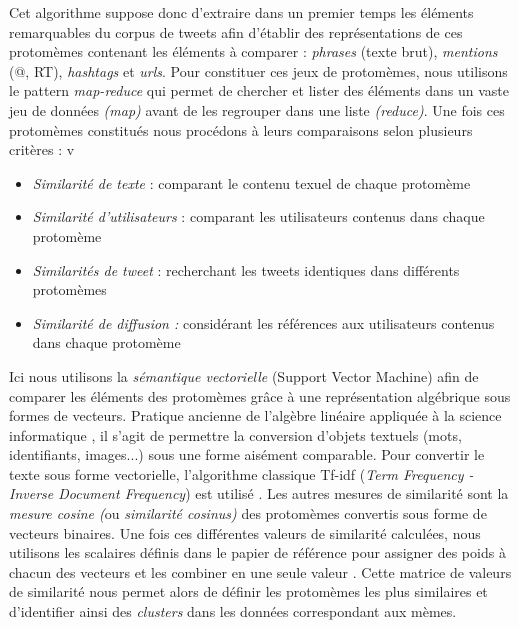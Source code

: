Cet algorithme suppose donc d{\textquoteright}extraire dans un premier
temps les \'el\'ements remarquables du corpus de tweets afin
d{\textquoteright}\'etablir des repr\'esentations de ces protom\`emes
contenant les \'el\'ements \`a comparer : \textit{phrases} (texte
brut), \textit{mentions }(@, RT), \textit{hashtags }et \textit{urls}.
Pour constituer ces jeux de protom\`emes, nous utilisons le pattern
\textit{map-reduce} qui permet de chercher et lister des \'el\'ements
dans un vaste jeu de donn\'ees \textit{(map)} avant de les regrouper
dans une liste \textit{(reduce)}. Une fois ces protom\`emes
constitu\'es nous proc\'edons \`a leurs comparaisons selon plusieurs
crit\`eres :
v
\begin{itemize}
\item \textit{Similarit\'e de texte }: comparant le contenu texuel de
chaque protom\`eme 
\item \textit{Similarit\'e d{\textquoteright}utilisateurs} : comparant
les utilisateurs contenus dans chaque protom\`eme
\item \textit{Similarit\'es de tweet }: recherchant les tweets
identiques dans diff\'erents protom\`emes
\item \textit{Similarit\'e de diffusion : }consid\'erant les
r\'ef\'erences aux utilisateurs contenus dans chaque protom\`eme
\end{itemize}
Ici nous utilisons la \textit{s\'emantique vectorielle} (Support Vector
Machine) afin de comparer les \'el\'ements des protom\`emes gr\^ace \`a
une repr\'esentation alg\'ebrique sous formes de vecteurs. Pratique
ancienne de l{\textquoteright}alg\`ebre lin\'eaire appliqu\'ee \`a la
science informatique \citep{Salton1975}, il s{\textquoteright}agit de
permettre la conversion d{\textquoteright}objets textuels (mots,
identifiants, images...) sous une forme ais\'ement comparable. Pour
convertir le texte sous forme vectorielle, l{\textquoteright}algorithme
classique Tf-idf (\textit{Term Frequency - Inverse Document Frequency})
est utilis\'e \citep{Soucy2005}. Les autres mesures de similarit\'e sont la
\textit{mesure cosine (}ou \textit{similarit\'e cosinus) }des
protom\`emes convertis sous forme de vecteurs binaires. Une fois ces
diff\'erentes valeurs de similarit\'e calcul\'ees, nous utilisons les
scalaires d\'efinis dans le papier de r\'ef\'erence pour assigner des
poids \`a chacun des vecteurs et les combiner en une seule valeur
\citep{Ferrara2013}. Cette matrice de valeurs de similarit\'e nous permet
alors de d\'efinir les protom\`emes les plus similaires et
d{\textquoteright}identifier ainsi des \textit{clusters }dans les
donn\'ees correspondant aux m\`emes.



